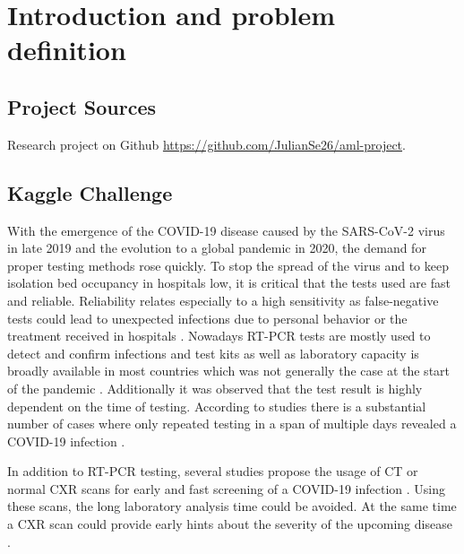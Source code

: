 

\chapter{Introduction and problem definition}\label{chapter:intro}

\section*{Project Sources}
Research project on Github \url{https://github.com/JulianSe26/aml-project}.

\section{Kaggle Challenge}\label{sec:kaggle}
With the emergence of the COVID-19 disease caused by the SARS-CoV-2 virus in late 2019 \autocite{huang2020clinical} and the evolution to a global pandemic in 2020, the demand for proper testing methods rose quickly. To stop the spread of the virus and to keep isolation bed occupancy in hospitals low, it is critical that the tests used are fast and reliable. Reliability relates especially to a high sensitivity as false-negative tests could lead to unexpected infections due to personal behavior or the treatment received in hospitals \autocite{west2020covid}. Nowadays \ac{RT-PCR} tests are mostly used to detect and confirm infections and test kits as well as laboratory capacity is broadly available in most countries \autocite{vankasteren2020104412} which was not generally the case at the start of the pandemic \autocite{Tannem1090}. Additionally it was observed that the test result is highly dependent on the time of testing. According to studies there is a substantial number of cases where only repeated testing in a span of multiple days revealed a COVID-19 infection \autocite{arevalo2020false}.

In addition to \ac{RT-PCR} testing, several studies propose the usage of \ac{CT} or normal \acf{CXR} scans for early and fast screening of a COVID-19 infection \autocite{fang2020sensitivity,xie2020chest}. Using these scans, the long laboratory analysis time could be avoided. At the same time a \acs{CXR} scan could provide early hints about the severity of the upcoming disease \autocite{yasin2020chest}. 

